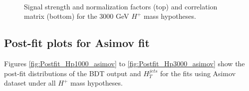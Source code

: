 \begin{figure}[H]
  \centering
  \\
  \caption{Signal strength and normalization factors (top) and correlation matrix (bottom) for the 3000 GeV $H^{+}$ mass hypotheses.}
  \label{fig:NormFactorsAndCorrMatrix_Hp3000}
\end{figure}


\subsection{Post-fit plots for Asimov fit}
\label{subsec:Postfit}
Figures \ref{fig:Postfit_Hp1000_asimov} to \ref{fig:Postfit_Hp3000_asimov} show the post-fit distributions of the BDT output and $H_{T}^{jets}$ for the fits using Asimov dataset under all $H^{+}$ mass hypotheses.


